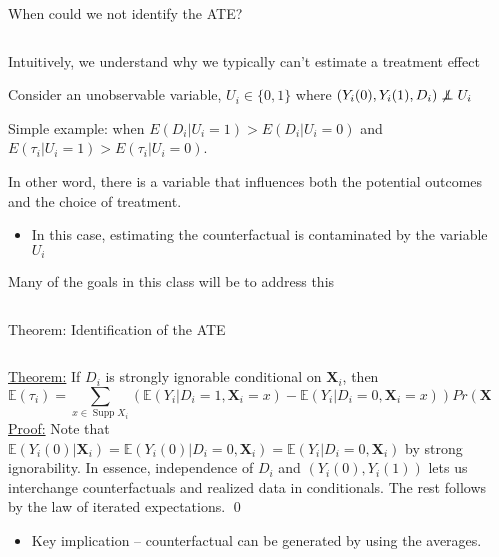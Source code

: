 \documentclass[notes,11pt, aspectratio=169]{beamer}
\newcommand\independent{\protect\mathpalette{\protect\independenT}{\perp}}
\def\independenT#1#2{\mathrel{\rlap{$#1#2$}\mkern2mu{#1#2}}}
\DeclareMathOperator{\Supp}{Supp}
\newenvironment{wideitemize}{\itemize\addtolength{\itemsep}{10pt}}{\enditemize}
\begin{document}
\begin{frame}{When could we not identify the ATE?}
  \begin{columns}[T] %
    \begin{column}{.65\textwidth}
      \begin{wideitemize}
      \item Intuitively, we understand why we typically can't estimate a  treatment effect
      \item Consider an unobservable variable, $U_{i} \in \{0, 1\}$ where $(Y_{i}(0) , Y_{i}(1), D_{i}) \not\independent U_{i}$
      \item Simple example: when
        $E(D_{i} | U_{i} = 1) > E(D_{i} | U_{i} = 0)$ and
        $E(\tau_{i} | U_{i} = 1) > E(\tau_{i} | U_{i} = 0)$.
      \item In other word, there is a variable that influences both
        the potential outcomes and the choice of treatment.
        \begin{itemize}
        \item In this case, estimating the counterfactual is
          contaminated by the variable $U_{i}$
        \end{itemize}
      \item Many of the goals in this class will be to address this
      \end{wideitemize}
\end{column}%
\hfill%
\begin{column}{.38\textwidth}
\end{column}%
\end{columns}
\end{frame}


\begin{frame}{Theorem: Identification of the ATE}
\begin{columns}[T] %
  \hspace{5pt} \begin{column}{.8\textwidth}

    \underline{Theorem:} If $D_{i}$ is strongly ignorable conditional on $\mathbf{X}_{i}$, then
    $$\mathbb{E}(\tau_{i}) = \sum_{x \in \Supp X_{i}} (\mathbb{E}(Y_{i} | D_{i} = 1, \mathbf{X}_{i} = x) - \mathbb{E}(Y_{i} | D_{i} = 0, \mathbf{X}_{i} = x) )Pr(\mathbf{X}_{i} = x)$$
    \underline{Proof:} Note that
    $\mathbb{E}(Y_{i}(0) | \mathbf{X}_{i} ) = \mathbb{E}(Y_{i}(0) | D_{i} = 0, \mathbf{X}_{i} ) = \mathbb{E}(Y_{i}
    | D_{i} = 0, \mathbf{X}_{i})$ by strong ignorability. In essence,
    independence of $D_{i}$ and $(Y_{i}(0), Y_{i}(1))$ lets us
    interchange counterfactuals and realized data in conditionals. The
    rest follows by the law of iterated expectations. \qed

    \begin{itemize}
    \item Key implication -- counterfactual can be generated by using the averages. 
    \end{itemize}
  \end{column}%
  \hfill%
  \begin{column}{.38\textwidth}
  \end{column}%
\end{columns}
\end{frame}
\end{document}
